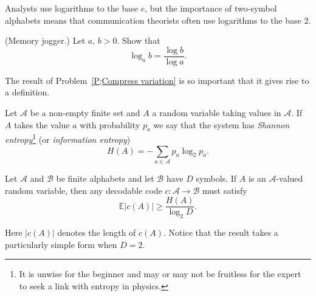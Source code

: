 Analysts use logarithms to the base $e$, but the importance
of two-symbol alphabets means that communication theorists
often use logarithms to the base $2$.
\begin{exercise}\label{E;Memory} 
(Memory jogger.) Let $a,\,b>0$. Show that
\[\log_{a} b=\frac{\log b}{\log a}.\]
\end{exercise}
The result of Problem~\ref{P;Compress variation}
is so important that it gives rise to a definition.
\begin{definition}\label{D;Shannon entropy} 
Let ${\mathcal A}$ be a 
non-empty finite set and $A$ a random variable taking
values in ${\mathcal A}$. If $A$ takes the value $a$
with probability $p_{a}$ we say that the system has 
\emph{Shannon entropy}\footnote{It is unwise for the beginner
and may or may not be fruitless for the expert
to seek a link with entropy in physics.} 
(or \emph{information entropy})
\[H(A)=-\sum_{a\in {\mathcal A}}p_{a}\log_{2} p_{a}.\]
\end{definition}
\begin{theorem}\label{T;no better} 
Let ${\mathcal A}$ and ${\mathcal B}$
be finite alphabets and let ${\mathcal B}$ have $D$ symbols. If 
$A$ is an ${\mathcal A}$-valued random variable, 
then any decodable code $c:{\mathcal A}\rightarrow{\mathcal B}$
must satisfy 
\[{\mathbb E}|c(A)|\geq \frac{H(A)}{\log_{2} D}.\]
\end{theorem}
Here $|c(A)|$ denotes the length of $c(A)$.
Notice that the result takes a particularly
simple form when $D=2$. 

